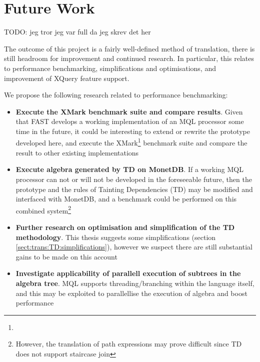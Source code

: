 \chapter{Future Work}
\label{chapter:future}

TODO: jeg tror jeg var full da jeg skrev det her

The outcome of this project is a fairly well-defined method of translation,
there is still headroom for improvement and continued research. In particular,
this relates to performance benchmarking, simplifications and optimisations,
and improvement of XQuery feature support.

We propose the following research related to performance benchmarking:
\begin{itemize}
  \item \textbf{Execute the XMark benchmark suite and compare results}. Given that FAST
  develops a working implementation of an MQL processor some time in the future, it could be interesting to extend or rewrite the
  prototype developed here, and execute the
  XMark\footnote{} 
  benchmark suite and compare the result to other existing implementations
  \item \textbf{Execute algebra generated by TD on MonetDB}. If a working MQL
  processor can not or will not be developed in the foreseeable future, then
  the prototype and the rules of Tainting Dependencies (TD) may be modified
  and interfaced with MonetDB, and a benchmark could be performed on this
  combined system\footnote{However, the translation of path expressions may
  prove difficult since TD does not support staircase join}
  \item \textbf{Further research on optimisation and simplification of the TD
  methodology}. This thesis suggests some simplifications (section
  \ref{sect:trans:TD:simplifications}), however we suspect there are still
  substantial gains to be made on this account
  \item \textbf{Investigate applicability of parallell execution of subtrees in the
  algebra tree}. MQL supports threading/branching within the language itself,
  and this may be exploited to parallellise the execution of algebra and boost
  performance
\end{itemize}

